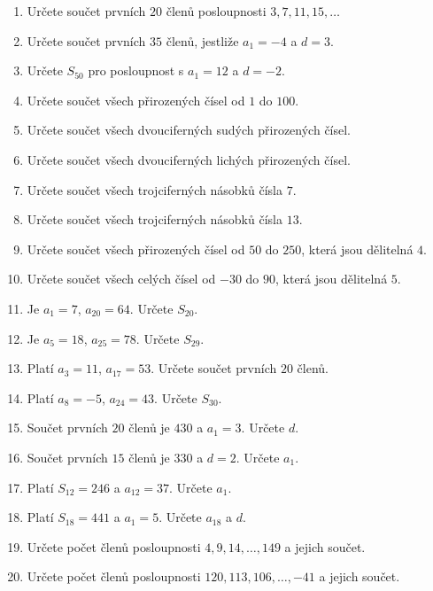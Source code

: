\documentclass[11pt,a4paper]{article}
\begin{document}
\begin{enumerate}[resume]
    \item Určete součet prvních $20$ členů posloupnosti $3, 7, 11, 15,\ldots$

    \item Určete součet prvních $35$ členů, jestliže $a_1=-4$ a $d=3$.

    \item Určete $S_{50}$ pro posloupnost s $a_1=12$ a $d=-2$.

    \item Určete součet všech přirozených čísel od $1$ do $100$.

    \item Určete součet všech dvouciferných sudých přirozených čísel.

    \item Určete součet všech dvouciferných lichých přirozených čísel.

    \item Určete součet všech trojciferných násobků čísla $7$.

    \item Určete součet všech trojciferných násobků čísla $13$.

    \item Určete součet všech přirozených čísel od $50$ do $250$, která jsou dělitelná $4$.

    \item Určete součet všech celých čísel od $-30$ do $90$, která jsou dělitelná $5$.

    \item Je $a_1=7$, $a_{20}=64$. Určete $S_{20}$.

    \item Je $a_5=18$, $a_{25}=78$. Určete $S_{29}$.

    \item Platí $a_3=11$, $a_{17}=53$. Určete součet prvních $20$ členů.

    \item Platí $a_8=-5$, $a_{24}=43$. Určete $S_{30}$.

    \item Součet prvních $20$ členů je $430$ a $a_1=3$. Určete $d$.

    \item Součet prvních $15$ členů je $330$ a $d=2$. Určete $a_1$.

    \item Platí $S_{12}=246$ a $a_{12}=37$. Určete $a_1$.

    \item Platí $S_{18}=441$ a $a_1=5$. Určete $a_{18}$ a $d$.

    \item Určete počet členů posloupnosti $4, 9, 14,\ldots,149$ a jejich součet.

    \item Určete počet členů posloupnosti $120, 113, 106,\ldots,-41$ a jejich součet.
\end{enumerate}
\end{document}

